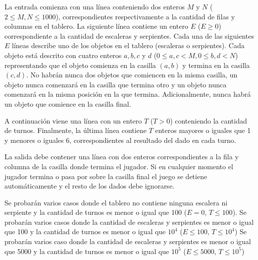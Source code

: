 \documentclass{oci}
\begin{document}
\begin{inputDescription}
  La entrada comienza con una línea conteniendo dos enteros $M$ y $N$ ($2 \leq
  M, N \leq 1000$), correspondientes respectivamente a la cantidad de filas y
  columnas en el tablero.
  La siguiente línea contiene un entero $E$ ($E \geq 0$) correspondiente a la
  cantidad de escaleras y serpientes.
  Cada una de las siguientes $E$ líneas describe uno de los objetos en el
  tablero (escaleras o serpientes).
  Cada objeto está descrito con cuatro enteros $a, b, c$ y $d$ ($0 \leq a, c
  < M, 0 \leq b, d < N$)
  representando que el objeto comienza en la casilla $(a, b)$ y termina en la
  casilla $(c, d)$.
  No habrán nunca dos objetos que comiencen en la misma casilla, un objeto
  nunca comenzará en la casilla que termina otro y un objeto nunca comenzará en
  la misma posición en la que termina.
  Adicionalmente, nunca habrá un objeto que comience en la casilla final.

  A continuación viene una línea con un entero $T$ ($T > 0$) conteniendo la
  cantidad de turnos.
  Finalmente, la última línea contiene $T$ enteros mayores o iguales que 1 y
  menores o iguales 6, correspondientes al resultado del dado en cada turno.
\end{inputDescription}

\begin{outputDescription}
  La salida debe contener una línea con dos enteros correspondientes a la
  fila y columna de la casilla donde termina el jugador.
  Si en cualquier momento el jugador termina o pasa por sobre la casilla final
  el juego se detiene automáticamente y el resto de los dados debe ignorarse.
\end{outputDescription}

\begin{scoreDescription}
   Se probarán varios casos donde el tablero no contiene ninguna
  escalera ni serpiente y la cantidad de turnos es menor o igual que 100
  ($E = 0$, $T \leq 100$).
   Se probarán varios casos donde la cantidad de escaleras y
  serpientes es menor o igual que 100 y la cantidad de turnos es menor o igual
  que $10^4$ ($E \leq 100$, $T \leq 10^4$)
   Se probarán varios caso donde la cantidad de escaleras y serpientes
  es menor o igual que 5000 y la cantidad de turnos es menor o igual que $10^5$
  ($E \leq 5000$, $T \leq 10^5$)
\end{scoreDescription}

\begin{sampleDescription}
\end{sampleDescription}
\end{document}
